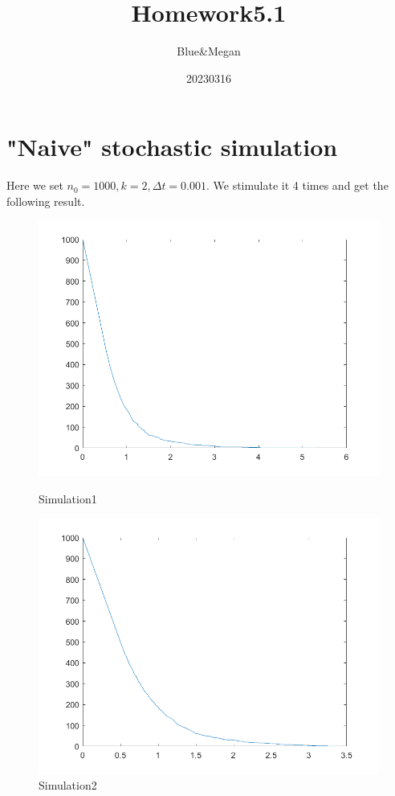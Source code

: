 \documentclass{article}
\title{Homework5.1}
\author{Blue\&Megan}
\date{20230316}
\begin{document}
\maketitle
\section{"Naive" stochastic simulation}
Here we set $n_0=1000,k=2,\Delta t=0.001$. We stimulate it 4 times and get the following result.
\begin{figure}[htbp]
    \centering
    \begin{minipage}{0.45\linewidth}
        \centering
        \includegraphics[width=\linewidth]{graph/a1.png}
        \caption{Simulation1}
        \label{a1}
    \end{minipage}
    \hfill
    \begin{minipage}{0.45\linewidth}
        \centering
        \includegraphics[width=\linewidth]{graph/a2.png}
        \caption{Simulation2}
        \label{a2}
    \end{minipage}
\end{figure}
\end{document}
